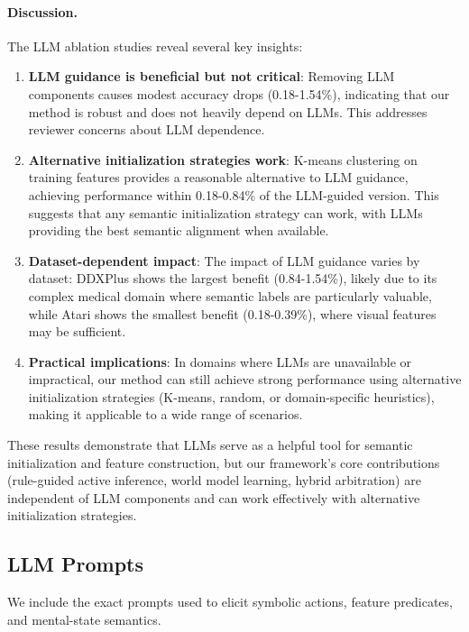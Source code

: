 \documentclass{article} %
\newcommand{\revise}[1]{#1}
\begin{document}
\revise{\paragraph{Discussion.}
The LLM ablation studies reveal several key insights:
\begin{enumerate}
    \item \textbf{LLM guidance is beneficial but not critical}: Removing LLM components causes modest accuracy drops (0.18-1.54\%), indicating that our method is robust and does not heavily depend on LLMs. This addresses reviewer concerns about LLM dependence.
    \item \textbf{Alternative initialization strategies work}: K-means clustering on training features provides a reasonable alternative to LLM guidance, achieving performance within 0.18-0.84\% of the LLM-guided version. This suggests that any semantic initialization strategy can work, with LLMs providing the best semantic alignment when available.
    \item \textbf{Dataset-dependent impact}: The impact of LLM guidance varies by dataset: DDXPlus shows the largest benefit (0.84-1.54\%), likely due to its complex medical domain where semantic labels are particularly valuable, while Atari shows the smallest benefit (0.18-0.39\%), where visual features may be sufficient.
    \item \textbf{Practical implications}: In domains where LLMs are unavailable or impractical, our method can still achieve strong performance using alternative initialization strategies (K-means, random, or domain-specific heuristics), making it applicable to a wide range of scenarios.
\end{enumerate}}
\revise{These results demonstrate that LLMs serve as a helpful tool for semantic initialization and feature construction, but our framework's core contributions (rule-guided active inference, world model learning, hybrid arbitration) are independent of LLM components and can work effectively with alternative initialization strategies.}

\subsection{LLM Prompts}
\label{Sec:D5}

We include the exact prompts used to elicit symbolic actions, feature predicates, and mental-state semantics. 
\end{document}
